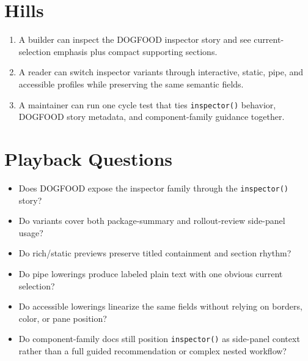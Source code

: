 \section{Hills}\label{record-095-hills}

\begin{enumerate}
\def\labelenumi{\arabic{enumi}.}
\tightlist
\item
  A builder can inspect the DOGFOOD inspector story and see current-selection emphasis plus compact supporting sections.
\item
  A reader can switch inspector variants through interactive, static, pipe, and accessible profiles while preserving the same semantic fields.
\item
  A maintainer can run one cycle test that ties \texttt{i\allowbreak{}n\allowbreak{}s\allowbreak{}p\allowbreak{}e\allowbreak{}c\allowbreak{}t\allowbreak{}o\allowbreak{}r\allowbreak{}(\allowbreak{})} behavior, DOGFOOD story metadata, and component-family guidance together.
\end{enumerate}

\section{Playback Questions}\label{record-095-playback-questions}

\begin{itemize}
\tightlist
\item
  Does DOGFOOD expose the inspector family through the \texttt{i\allowbreak{}n\allowbreak{}s\allowbreak{}p\allowbreak{}e\allowbreak{}c\allowbreak{}t\allowbreak{}o\allowbreak{}r\allowbreak{}(\allowbreak{})} story?
\item
  Do variants cover both package-summary and rollout-review side-panel usage?
\item
  Do rich/static previews preserve titled containment and section rhythm?
\item
  Do pipe lowerings produce labeled plain text with one obvious current selection?
\item
  Do accessible lowerings linearize the same fields without relying on borders, color, or pane position?
\item
  Do component-family docs still position \texttt{i\allowbreak{}n\allowbreak{}s\allowbreak{}p\allowbreak{}e\allowbreak{}c\allowbreak{}t\allowbreak{}o\allowbreak{}r\allowbreak{}(\allowbreak{})} as side-panel context rather than a full guided recommendation or complex nested workflow?
\end{itemize}

